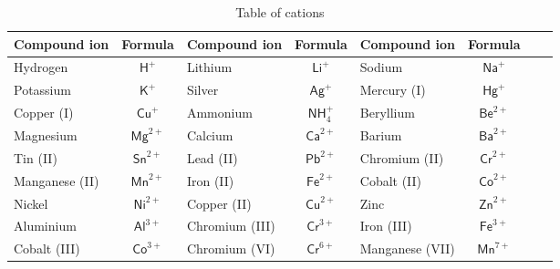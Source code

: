 \begin{enumerate}[noitemsep, label=\textbf{\arabic*}. ]
      
\begin{table}[H]
\begin{center}
\label{tab:cations}
\begin{tabular}{|l|c|l|c|l|c|l|c|} \hline
\textbf{Compound ion} & \textbf{Formula} & \textbf{Compound ion} & \textbf{Formula} & \textbf{Compound ion} & \textbf{Formula}  \\ \hline
Hydrogen       & $\mathsf{H}^{+}$   & Lithium        & $\mathsf{Li}^{+}$     & Sodium          & $\mathsf{Na}^{+}$  \\ \hline
Potassium      & $\mathsf{K}^{+}$   & Silver         & $\mathsf{Ag}^{+}$     & Mercury (I)     & $\mathsf{Hg}^{+}$  \\ \hline
Copper (I)     & $\mathsf{Cu}^{+}$  & Ammonium       & $\mathsf{NH}_{4}^{+}$ & Beryllium       & $\mathsf{Be}^{2+}$ \\ \hline
Magnesium      & $\mathsf{Mg}^{2+}$ & Calcium        & $\mathsf{Ca}^{2+}$    & Barium          & $\mathsf{Ba}^{2+}$ \\ \hline
Tin (II)       & $\mathsf{Sn}^{2+}$ & Lead (II)      & $\mathsf{Pb}^{2+}$    & Chromium (II)   & $\mathsf{Cr}^{2+}$ \\ \hline
Manganese (II) & $\mathsf{Mn}^{2+}$ & Iron (II)      & $\mathsf{Fe}^{2+}$    & Cobalt (II)     & $\mathsf{Co}^{2+}$ \\ \hline
Nickel         & $\mathsf{Ni}^{2+}$ & Copper (II)    & $\mathsf{Cu}^{2+}$    & Zinc            & $\mathsf{Zn}^{2+}$ \\ \hline
Aluminium      & $\mathsf{Al}^{3+}$ & Chromium (III) & $\mathsf{Cr}^{3+}$    & Iron (III)      & $\mathsf{Fe}^{3+}$ \\ \hline
Cobalt (III)   & $\mathsf{Co}^{3+}$  & Chromium (VI)  & $\mathsf{Cr}^{6+}$    & Manganese (VII) & $\mathsf{Mn}^{7+}$ \\ \hline

\end{tabular}

 \end{center}
\caption{Table of cations}
\label{tab:cations}
\end{table}


\end{enumerate}
